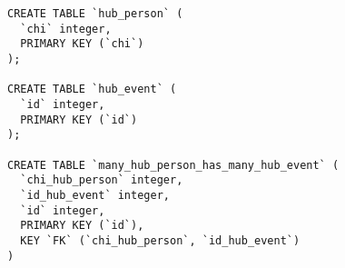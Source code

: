 \begin{lstlisting}
CREATE TABLE `hub_person` (
  `chi` integer,
  PRIMARY KEY (`chi`)
);

CREATE TABLE `hub_event` (
  `id` integer,
  PRIMARY KEY (`id`)
);

CREATE TABLE `many_hub_person_has_many_hub_event` (
  `chi_hub_person` integer,
  `id_hub_event` integer,
  `id` integer,
  PRIMARY KEY (`id`),
  KEY `FK` (`chi_hub_person`, `id_hub_event`)
)

\end{lstlisting}
